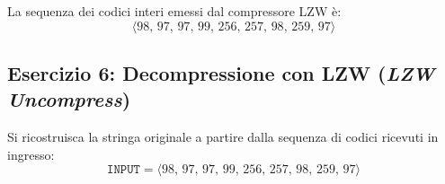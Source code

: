 \begin{table}[H]
\centering
\small
\caption{Tracciamento dettagliato dei passi dell'algoritmo di compressione LZW.}
\label{tab:tracciamento-lzw-compress}
\end{table}

La sequenza dei codici interi emessi dal compressore LZW \`e:
\begin{equation}
  \langle 98, \, 97, \, 97, \, 99, \, 256, \, 257, \, 98, \, 259, \, 97 \rangle
\end{equation}

\FloatBarrier
\subsection{Esercizio 6: Decompressione con LZW (\textit{LZW Uncompress})}
\label{subsec:es6-lzw-uncompress}

\begin{example}
Si ricostruisca la stringa originale a partire dalla sequenza di codici ricevuti in ingresso:
\begin{equation}
  \texttt{INPUT} = \langle 98, \, 97, \, 97, \, 99, \, 256, \, 257, \, 98, \, 259, \, 97 \rangle
\end{equation}
\end{example}

